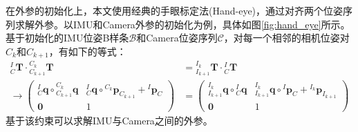 在外参的初始化上，本文使用经典的手眼标定法(Hand-eye)，通过对齐两个位姿序列求解外参。以IMU和Camera外参的初始化为例，具体如图\ref{fig:hand_eye}所示。基于初始化的IMU位姿B样条$\mathcal{B}$和Camera位姿序列$\mathcal{C}$，对每一个相邻的相机位姿对$C_k$和$C_{k+1}$，有如下的等式：
\begin{equation}
  \label{equ:hand_eye}
  \begin{aligned}
    {{^{I}_{C}}\boldsymbol{T}}\cdot{^{C_k}_{C_{k+1}}\boldsymbol{T}}                                                                                                                                                                                                            & ={^{I_k}_{I_{k+1}}\boldsymbol{T}}\cdot{{^{I}_{C}}\boldsymbol{T}} \\\to
    \begin{pmatrix}
      {{^{I}_{C}}\boldsymbol{q}}\circ{^{C_k}_{C_{k+1}}\boldsymbol{q}} & {{^{I}_{C}}\boldsymbol{q}}\circ{^{C_k}\boldsymbol{p}_{C_{k+1}}}+{^{I}\boldsymbol{p}_{C}} \\
      \boldsymbol{0}                                                  & 1
    \end{pmatrix} & =\begin{pmatrix}
                       {{^{I_k}_{I_{k+1}}}\boldsymbol{q}}\circ{^{I}_{C}\boldsymbol{q}} & {{^{I_k}_{I_{k+1}}}\boldsymbol{q}}\circ{^{I}\boldsymbol{p}_{C}}+{^{I_k}\boldsymbol{p}_{I_{k+1}}} \\
                       \boldsymbol{0}                                                  & 1
                     \end{pmatrix}
  \end{aligned}
\end{equation}
基于该约束可以求解IMU与Camera之间的外参。

